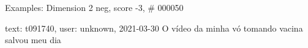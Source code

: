 \begin{frame}{Examples: Dimension 2 neg, score -3, \# 000050}
\footnotesize
\begin{alertblock}{text: t091740, user: unknown, 2021-03-30}
O vídeo da minha vó tomando vacina salvou meu dia 
 \textbf{} 
\textbf{} 
\textbf{} 
\end{alertblock}
\end{frame}
